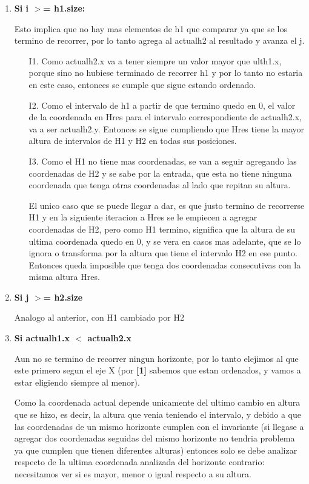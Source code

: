\documentclass[10pt,a4paper]{article}
\begin{document}
\begin{enumerate}
\item \textbf{Si i $>$= h1.size:}

Esto implica que no hay mas elementos de h1 que comparar ya que se los termino de recorrer, por lo tanto agrega al actualh2 al resultado y avanza el j. 
\begin{itemize}
\item[I1.] Como actualh2.x va a tener siempre un valor mayor que ulth1.x, porque sino no hubiese terminado de recorrer h1 y por lo tanto no estaria en este caso, entonces se cumple que sigue estando ordenado.
\item[I2.] Como el intervalo de h1 a partir de que termino quedo en 0, el valor de la coordenada en Hres para el intervalo correspondiente de actualh2.x, va a ser actualh2.y. Entonces se sigue cumpliendo que Hres tiene la mayor altura de intervalos de H1 y H2 en todas sus posiciones.
\item[I3.] Como el H1 no tiene mas coordenadas, se van a seguir agregando las coordenadas de H2 y se sabe por la entrada, que esta no tiene ninguna coordenada que tenga otras coordenadas al lado que repitan su altura. 

El unico caso que se puede llegar a dar, es que justo termino de recorrerse H1 y en la siguiente iteracion a Hres se le empiecen a agregar coordenadas de H2, pero como H1 termino, significa que la altura de su ultima coordenada quedo en 0, y se vera en casos mas adelante, que se lo ignora o transforma por la altura que tiene el intervalo H2 en ese punto. Entonces queda imposible que tenga dos coordenadas consecutivas con la misma altura Hres.\\
\end{itemize}
\item \textbf{Si j $>$= h2.size}

Analogo al anterior, con H1 cambiado por H2	\\

\item \textbf{Si actualh1.x $<$ actualh2.x}

Aun no se termino de recorrer ningun horizonte, por lo tanto elejimos al que este primero segun el eje X (por \textbf{[1]} sabemos que estan ordenados, y vamos a estar eligiendo siempre al menor). 

Como la coordenada actual depende unicamente del ultimo cambio en altura que se hizo, es decir, la altura que venia teniendo el intervalo, y debido a que las coordenadas de un mismo horizonte cumplen con el invariante (si llegase a agregar dos coordenadas seguidas del mismo horizonte no tendria problema ya que cumplen que tienen diferentes alturas) entonces solo se debe analizar respecto de la ultima coordenada analizada del horizonte contrario: necesitamos ver si es mayor, menor o igual respecto a su altura.


\end{enumerate}
\end{document}
